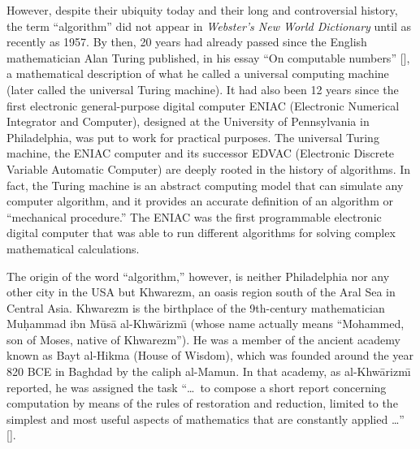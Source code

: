 However, despite their ubiquity today and their long and controversial history, the term ``algorithm'' did not appear in \textit{Webster's New World Dictionary} until as recently as 1957. By then, 20 years had already passed since the English mathematician Alan Turing published, in his essay ``On computable numbers'' [\citealt{chap:01:Turing:1937}], a mathematical description of what he called a universal computing machine (later called the universal Turing machine). It had also been 12 years since the first electronic general-purpose digital computer ENIAC (Electronic Numerical Integrator and Computer), designed at the University of Pennsylvania in Philadelphia, was put to work for practical purposes. The universal Turing machine, the ENIAC computer and its successor EDVAC (Electronic Discrete Variable Automatic Computer) are deeply rooted in the history of algorithms. In fact, the Turing machine is an abstract computing model that can simulate any computer algorithm, and it provides an accurate definition of an algorithm or ``mechanical procedure.'' The ENIAC was the first programmable electronic digital computer that was able to run different algorithms for solving complex mathematical calculations.

The origin of the word ``algorithm,'' however, is neither Philadelphia nor any other city in the USA but Khwarezm, an oasis region south of the Aral Sea in Central Asia. Khwarezm is the birthplace of the 9th-century mathematician Mu\d{h}ammad ibn M\={u}s\={a} al-Khw\={a}rizm\={\i} (whose name actually means ``Mohammed, son of Moses, native of Khwarezm''). He was a member of the ancient academy known as Bayt al-Hikma (House of Wisdom), which was founded around the year 820 BCE in Baghdad by the caliph al-Mamun. In that academy, as al-Khw\={a}rizm\={\i} reported, he was assigned the task ``\ldots~to compose a short report concerning computation by means of the rules of restoration and reduction, limited to the simplest and most useful aspects of mathematics that are constantly applied \ldots '' [\citealt{chap:01:Ausiello:2013}].

